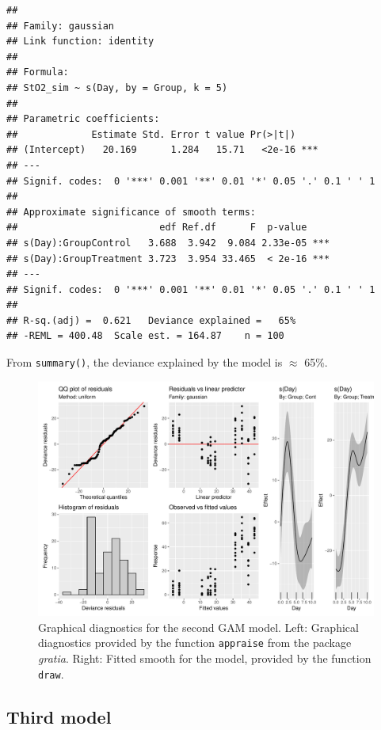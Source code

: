 \documentclass[
]{article}
\newcommand{\passthrough}[1]{#1}
\begin{document}
\begin{lstlisting}
## 
## Family: gaussian 
## Link function: identity 
## 
## Formula:
## StO2_sim ~ s(Day, by = Group, k = 5)
## 
## Parametric coefficients:
##             Estimate Std. Error t value Pr(>|t|)    
## (Intercept)   20.169      1.284   15.71   <2e-16 ***
## ---
## Signif. codes:  0 '***' 0.001 '**' 0.01 '*' 0.05 '.' 0.1 ' ' 1
## 
## Approximate significance of smooth terms:
##                         edf Ref.df      F  p-value    
## s(Day):GroupControl   3.688  3.942  9.084 2.33e-05 ***
## s(Day):GroupTreatment 3.723  3.954 33.465  < 2e-16 ***
## ---
## Signif. codes:  0 '***' 0.001 '**' 0.01 '*' 0.05 '.' 0.1 ' ' 1
## 
## R-sq.(adj) =  0.621   Deviance explained =   65%
## -REML = 400.48  Scale est. = 164.87    n = 100
\end{lstlisting}

From \passthrough{\lstinline!summary()!}, the deviance explained by the model is \(\approx\) 65\%.



\begin{figure}

{\centering \includegraphics[width=0.75\linewidth]{Appendix_A_files/figure-latex/second-GAM-diag-1} 

}

\caption{Graphical diagnostics for the second GAM model. Left: Graphical diagnostics provided by the function \passthrough{\lstinline!appraise!} from the package \emph{gratia}. Right: Fitted smooth for the model, provided by the function \passthrough{\lstinline!draw!}.}\label{fig:second-GAM-diag}
\end{figure}

\hypertarget{third-model}{%
\subsection{Third model}\label{third-model}}
\end{document}
